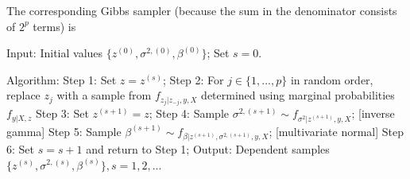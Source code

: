 The corresponding Gibbs sampler (because the sum in the denominator consists of \( 2^p \) terms) is

Input: Initial values \(\{z^{(0)}, \sigma^{2,(0)}, \beta^{(0)}\}\); Set \(s = 0\).

Algorithm:
Step 1: Set \(z = z^{(s)}\);
Step 2: For \(j \in \{1, ..., p\}\) in random order, replace \(z_j\) with a sample from \(f_{z_j | z_{-j}, y, X}\) 
determined using marginal probabilities \(f_{y | X, z}\)
Step 3: Set \(z^{(s+1)} = z\);
Step 4: Sample \(\sigma^{2,(s+1)} \sim f_{\sigma^2 | z^{(s+1)}, y, X}\); [inverse gamma]
Step 5: Sample \(\beta^{(s+1)} \sim f_{\beta | z^{(s+1)}, \sigma^{2,(s+1)}, y, X}\); [multivariate normal]
Step 6: Set \(s = s + 1\) and return to Step 1;
Output: Dependent samples \(\{z^{(s)}, \sigma^{2,(s)}, \beta^{(s)}\}, s = 1, 2, ...\)
